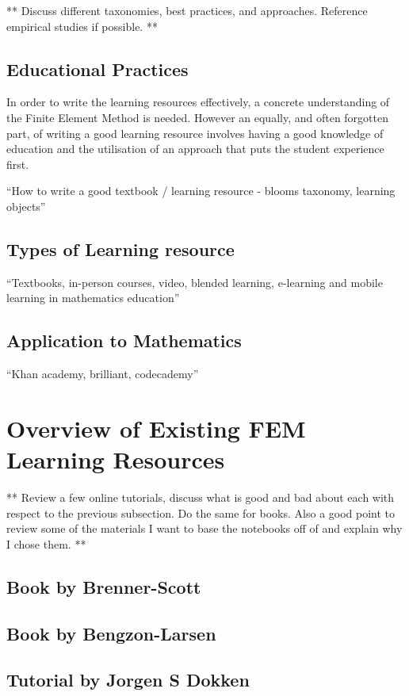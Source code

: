 ** Discuss different taxonomies, best practices, and approaches. Reference empirical studies if possible. **

\subsection{Educational Practices}

In order to write the learning resources effectively, a concrete understanding of the Finite Element Method is needed. However an equally, and often forgotten part, of writing a good learning resource involves having a good knowledge of education and the utilisation of an approach that puts the student experience first.

``How to write a good textbook / learning resource - blooms taxonomy, learning objects''

\subsection{Types of Learning resource}

``Textbooks, in-person courses, video, blended learning, e-learning and mobile learning in mathematics education''

\subsection{Application to Mathematics}

``Khan academy, brilliant, codecademy''

\section{Overview of Existing FEM Learning Resources}

** Review a few online tutorials, discuss what is good and bad about each with respect to the previous subsection. Do the same for books. Also a good point to review some of the materials I want to base the notebooks off of and explain why I chose them. **

\subsection{Book by Brenner-Scott}

\subsection{Book by Bengzon-Larsen}

\subsection{Tutorial by Jorgen S Dokken}